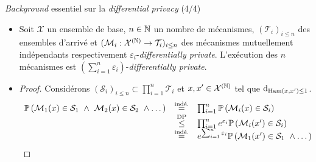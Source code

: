 \documentclass[10pt,serif]{beamer}
\begin{document}
  \begin{frame}{\textit{Background} essentiel sur la \textit{differential privacy} (4/4)}
    \begin{itemize}
      \item<1-> \begin{theorem}
          \label{compo}
          Soit \(\mathcal X\) un ensemble de base, \(n \in \mathbb{N}\) un nombre de mécanismes, \((\mathcal T_i)_{i \leq n}\) des ensembles d'arrivé et \((\mathcal M_i : \mathcal X^{(\mathbb{N})} \to \mathcal T_i)_{i \leq n}\) des mécanismes mutuellement indépendants respectivement \(\varepsilon_i\)-\textit{differentially private}. L’exécution des \(n\) mécanismes est \(\left(\sum\limits_{i = 1}^n \varepsilon_i\right)\)-\textit{differentially private}.
        \end{theorem} 
        \vspace{-0.3cm}
      \item<2> \begin{proof}
          Considérons \((\mathcal S_i)_{i \leq n} \subset \prod_{i = 1}^n \mathcal T_i\) et \(x, x' \in \mathcal X^{(\mathbb{N})}\) tel que \(\mathrm{d}_{\text{Ham}(x,x') \leq 1}\).
          \[
              \begin{array}[]{rcl}
                  \mathbb P\left(\mathcal M_1(x) \in \mathcal S_1 \ \wedge \ \mathcal M_2(x) \in \mathcal S_2 \ \wedge \dots \right) & \overset{\text{indé.}}{=} & \prod_{i = 1}^n \mathbb P\left(\mathcal M_i(x) \in \mathcal S_i \right)\\
                  & \overset{\text{DP}}{\leq} & \prod_{i = 1}^n e^{\varepsilon_i}\mathbb P\left(\mathcal M_i(x') \in \mathcal S_i \right)\\
                  & \overset{\text{indé.}}{=} & e^{\sum_{i = 1}^n \varepsilon_i}\mathbb P\left(\mathcal M_1(x') \in \mathcal S_1 \ \wedge \dots \right)
              \end{array}
          \]
        \end{proof}
    \end{itemize}
  \end{frame}
\end{document}
